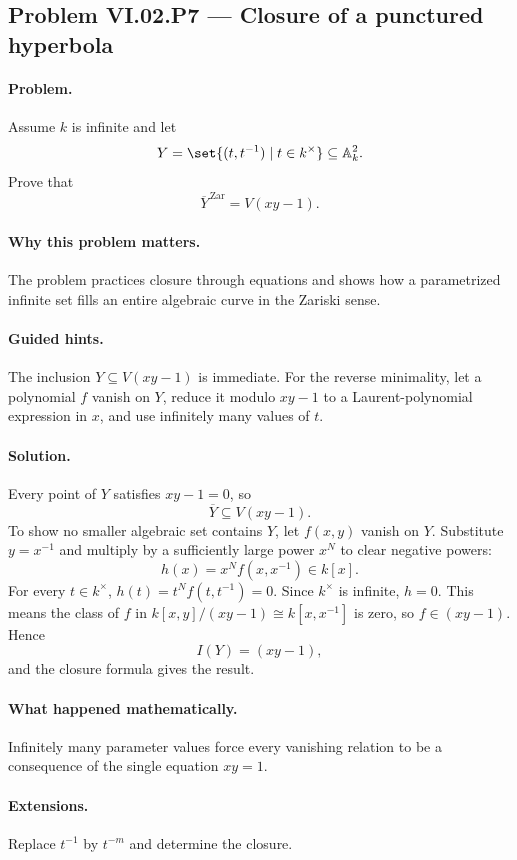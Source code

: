 \subsection*{Problem VI.02.P7 --- Closure of a punctured hyperbola}
\label{prob:vi02-p7}

\paragraph{Problem.}
Assume \(k\) is infinite and let
\[
Y=\set{(t,t^{-1})\mid t\in k^\times}\subseteq\mathbb A_k^2.
\]
Prove that
\[
\overline Y^{\,\mathrm{Zar}}=V(xy-1).
\]

\ifdefined\FullProblemDossiers
\paragraph{Why this problem matters.}
The problem practices closure through equations and shows how a parametrized infinite set
fills an entire algebraic curve in the Zariski sense.

\paragraph{Guided hints.}
The inclusion \(Y\subseteq V(xy-1)\) is immediate.  For the reverse minimality, let a
polynomial \(f\) vanish on \(Y\), reduce it modulo \(xy-1\) to a Laurent-polynomial
expression in \(x\), and use infinitely many values of \(t\).

\paragraph{Solution.}
Every point of \(Y\) satisfies \(xy-1=0\), so
\[
\overline Y\subseteq V(xy-1).
\]
To show no smaller algebraic set contains \(Y\), let \(f(x,y)\) vanish on \(Y\).  Substitute
\(y=x^{-1}\) and multiply by a sufficiently large power \(x^N\) to clear negative powers:
\[
h(x)=x^Nf(x,x^{-1})\in k[x].
\]
For every \(t\in k^\times\), \(h(t)=t^Nf(t,t^{-1})=0\).  Since \(k^\times\) is infinite,
\(h=0\).  This means the class of \(f\) in
\(k[x,y]/(xy-1)\cong k[x,x^{-1}]\) is zero, so \(f\in(xy-1)\).  Hence
\[
I(Y)=(xy-1),
\]
and the closure formula gives the result.

\paragraph{What happened mathematically.}
Infinitely many parameter values force every vanishing relation to be a consequence of the
single equation \(xy=1\).

\paragraph{Extensions.}
Replace \(t^{-1}\) by \(t^{-m}\) and determine the closure.
\fi
